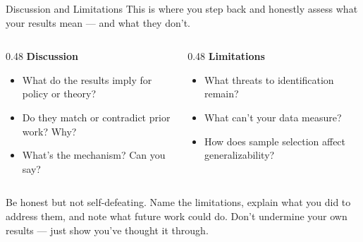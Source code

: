 \begin{frame}{Discussion and Limitations}
  \small
  This is where you step back and honestly assess what your results mean --- and what they don't.

  \vspace{6pt}

  \begin{columns}[T]
    \begin{column}{0.48\textwidth}
      \textbf{\textcolor{usfgreen}{Discussion}}
      \begin{itemize}\setlength\itemsep{0pt}
        \item What do the results imply for policy or theory?
        \item Do they match or contradict prior work? Why?
        \item What's the mechanism? Can you say?
      \end{itemize}
    \end{column}
    \begin{column}{0.48\textwidth}
      \textbf{\textcolor{usfgreen}{Limitations}}
      \begin{itemize}\setlength\itemsep{0pt}
        \item What threats to identification remain?
        \item What can't your data measure?
        \item How does sample selection affect generalizability?
      \end{itemize}
    \end{column}
  \end{columns}

  \vspace{6pt}

  Be honest but not self-defeating. Name the limitations, explain what you did to address them, and note what future work could do. Don't undermine your own results --- just show you've thought it through.
\end{frame}

